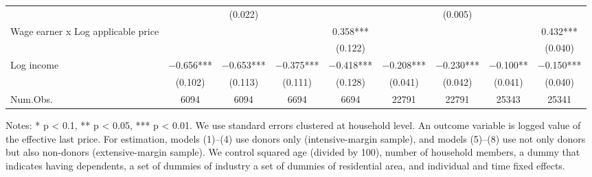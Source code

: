 \begin{landscape}
\begin{table}
\begin{threeparttable}
\begin{tabular}[t]{lcccccccc}
 &  & (\num{0.022}) &  &  &  & (\num{0.005}) &  & \\
Wage earner x Log applicable price &  &  &  & \num{0.358}*** &  &  &  & \num{0.432}***\\
 &  &  &  & (\num{0.122}) &  &  &  & (\num{0.040})\\
Log income & \num{-0.656}*** & \num{-0.653}*** & \num{-0.375}*** & \num{-0.418}*** & \num{-0.208}*** & \num{-0.230}*** & \num{-0.100}** & \num{-0.150}***\\
 & (\num{0.102}) & (\num{0.113}) & (\num{0.111}) & (\num{0.128}) & (\num{0.041}) & (\num{0.042}) & (\num{0.041}) & (\num{0.040})\\
\midrule
Num.Obs. & \num{6094} & \num{6094} & \num{6694} & \num{6694} & \num{22791} & \num{22791} & \num{25343} & \num{25341}\\
\bottomrule
\end{tabular}
\begin{tablenotes}
\item Notes: * p < 0.1, ** p < 0.05, *** p < 0.01. We use standard errors clustered at household level. An outcome variable is logged value of the effective last price. For estimation, models (1)--(4) use donors only (intensive-margin sample), and models (5)--(8) use not only donors but also non-donors (extensive-margin sample).  We control squared age (divided by 100), number of household members, a dummy that indicates having dependents, a set of dummies of industry a set of dummies of residential area, and individual and time fixed effects.
\end{tablenotes}
\end{threeparttable}
\end{table}
\end{landscape}
